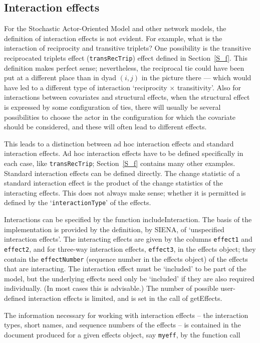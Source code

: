 \documentclass[a4paper,fleqn,11pt]{article}
\newcommand{\+}{\, + \,}
\newcommand{\sfn}[1]{\textsf{#1}}
\newcommand{\si}{{\sf SIENA}}
\newcommand{\SAOM}{{Stochastic Actor-Oriented Model }}
\begin{document}
\hypertarget{T_int_eff}{
\subsection{Interaction effects}
}
\label{S_int_eff}

For the \SAOM and other network models, the definition of interaction
effects is not evident. For example, what is the interaction of
reciprocity and transitive triplets? One possibility is the
transitive reciprocated triplets effect (\texttt{transRecTrip})
effect defined in Section~\ref{S_f}.
This definition makes perfect sense; nevertheless, the reciprocal tie could
have been put at a different place than in dyad $(i,j)$
in the picture there --- which would have led
to a different type of interaction `reciprocity $\times$ transitivity'.
Also for interactions between covariates and structural effects,
when the structural effect is expressed by some configuration of ties,
there will usually be several possibilities to choose the actor in the
configuration for which the covariate should be considered, and these will
often lead to different effects.

This leads to a distinction between ad hoc interaction effects and standard
interaction effects.
Ad hoc interaction effects have to be defined specifically in each case,
like \texttt{transRecTrip}; Section~\ref{S_f} contains many other examples.
Standard interaction effects can be defined directly.
The change statistic of a standard interaction effect is the product of the
change statistics of the interacting effects.
This does not always make sense; whether it is permitted
is defined by the `\texttt{interactionType}' of the effects.

Interactions can be specified by the function \sfn{includeInteraction}.
The basis of the implementation is provided by the definition,
by \si, of `unspecified interaction effects'.
The interacting effects are given by
the columns \texttt{effect1} and \texttt{effect2},
and for three-way interaction effects, \texttt{effect3},
in the effects object; they contain the \texttt{effectNumber}
(sequence number in the effects object) of the effects that are interacting.
The interaction effect must be `included' to be part of the model,
but the underlying effects need only be `included' if
they are also required individually.
(In most cases this is advisable.)
The number of possible user-defined interaction effects is limited,
and is set in the call of \sfn{getEffects}.
\medskip

The information necessary for working with interaction effects
-- the interaction types, short names, and sequence numbers
of the effects -- is contained in the document produced
for a given effects object, say \texttt{myeff}, by the function call
\end{document}
